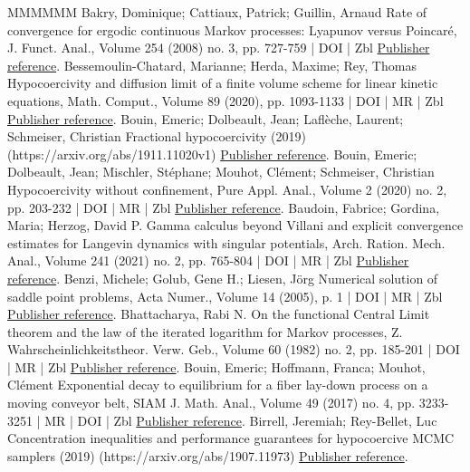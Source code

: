 \begin{thebibliography}{MMMMMM}
 Bakry, Dominique; Cattiaux, Patrick; Guillin, Arnaud Rate of convergence for ergodic continuous Markov processes: Lyapunov versus Poincaré, J. Funct. Anal., Volume 254 (2008) no. 3, pp. 727-759 | DOI | Zbl \href{https://ahl.centre-mersenne.org/item/AHL_2022__5__523_0/#BCG08}{Publisher reference}.
 Bessemoulin-Chatard, Marianne; Herda, Maxime; Rey, Thomas Hypocoercivity and diffusion limit of a finite volume scheme for linear kinetic equations, Math. Comput., Volume 89 (2020), pp. 1093-1133 | DOI | MR | Zbl \href{https://ahl.centre-mersenne.org/item/AHL_2022__5__523_0/#BCHR19}{Publisher reference}.
 Bouin, Emeric; Dolbeault, Jean; Laflèche, Laurent; Schmeiser, Christian Fractional hypocoercivity (2019) (https://arxiv.org/abs/1911.11020v1) \href{https://ahl.centre-mersenne.org/item/AHL_2022__5__523_0/#BDLS19}{Publisher reference}.
 Bouin, Emeric; Dolbeault, Jean; Mischler, Stéphane; Mouhot, Clément; Schmeiser, Christian Hypocoercivity without confinement, Pure Appl. Anal., Volume 2 (2020) no. 2, pp. 203-232 | DOI | MR | Zbl \href{https://ahl.centre-mersenne.org/item/AHL_2022__5__523_0/#BDMMS17}{Publisher reference}.
 Baudoin, Fabrice; Gordina, Maria; Herzog, David P. Gamma calculus beyond Villani and explicit convergence estimates for Langevin dynamics with singular potentials, Arch. Ration. Mech. Anal., Volume 241 (2021) no. 2, pp. 765-804 | DOI | MR | Zbl \href{https://ahl.centre-mersenne.org/item/AHL_2022__5__523_0/#BGH19}{Publisher reference}.
 Benzi, Michele; Golub, Gene H.; Liesen, Jörg Numerical solution of saddle point problems, Acta Numer., Volume 14 (2005), p. 1 | DOI | MR | Zbl \href{https://ahl.centre-mersenne.org/item/AHL_2022__5__523_0/#benzi2005numerical}{Publisher reference}.
 Bhattacharya, Rabi N. On the functional Central Limit theorem and the law of the iterated logarithm for Markov processes, Z. Wahrscheinlichkeitstheor. Verw. Geb., Volume 60 (1982) no. 2, pp. 185-201 | DOI | MR | Zbl \href{https://ahl.centre-mersenne.org/item/AHL_2022__5__523_0/#Bhattacharya}{Publisher reference}.
 Bouin, Emeric; Hoffmann, Franca; Mouhot, Clément Exponential decay to equilibrium for a fiber lay-down process on a moving conveyor belt, SIAM J. Math. Anal., Volume 49 (2017) no. 4, pp. 3233-3251 | MR | DOI | Zbl \href{https://ahl.centre-mersenne.org/item/AHL_2022__5__523_0/#BHM17}{Publisher reference}.
 Birrell, Jeremiah; Rey-Bellet, Luc Concentration inequalities and performance guarantees for hypocoercive MCMC samplers (2019) (https://arxiv.org/abs/1907.11973) \href{https://ahl.centre-mersenne.org/item/AHL_2022__5__523_0/#BRB19}{Publisher reference}.

\end{thebibliography}
